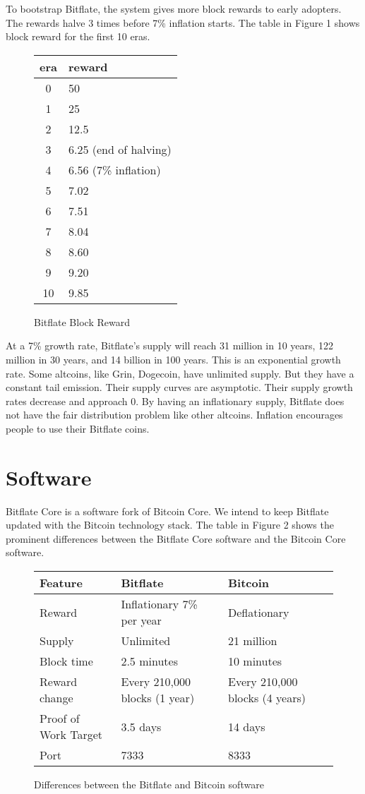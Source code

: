 \documentclass{article}      %
\begin{document}
To bootstrap Bitflate, the system gives more block rewards to early adopters. The rewards halve 3 times before 7\% inflation starts. The table in Figure 1 shows block reward for the first 10 eras.

\begin{figure}[h]
\centering
\begin{tabular}{ |c|l| } 
 \hline
 era & reward \\
 \hline
 0  & 50 \\
 1 & 25 \\
 2 & 12.5 \\
 3 & 6.25 (end of halving) \\
 4 & 6.56 (7\% inflation) \\
 5 & 7.02 \\
 6 & 7.51 \\
 7 & 8.04 \\
 8 & 8.60 \\
 9 & 9.20 \\
 10 & 9.85 \\
 \hline
\end{tabular}
\caption{Bitflate Block Reward}
\end{figure}

At a 7\% growth rate, Bitflate's supply will reach 31 million in 10 years, 122 million in 30 years, and 14 billion in 100 years. This is an exponential growth rate. Some altcoins, like Grin, Dogecoin, have unlimited supply. But they have a constant tail emission. Their supply curves are asymptotic. Their supply growth rates decrease and approach 0. By having an inflationary supply, Bitflate does not have the fair distribution problem like other altcoins. Inflation encourages people to use their Bitflate coins.

\section{Software}

Bitflate Core is a software fork of Bitcoin Core. We intend to keep Bitflate updated with the Bitcoin technology stack. The table in Figure 2 shows the prominent differences between the Bitflate Core software and the Bitcoin Core software.

\begin{figure}[h]
\centering
\begin{tabular}{ |l|l|l| } 
 \hline
 Feature & Bitflate & Bitcoin \\
 \hline
 Reward & Inflationary 7\% per year & Deflationary \\
 \hline
 Supply & Unlimited & 21 million \\
 \hline
 Block time & 2.5 minutes & 10 minutes \\
 \hline
 Reward change & Every 210,000 blocks (1 year) & Every 210,000 blocks (4 years) \\
 \hline
 Proof of Work Target & 3.5 days & 14 days \\
 \hline
 Port & 7333 & 8333 \\
 \hline
\end{tabular}
\caption{Differences between the Bitflate and Bitcoin software}
\end{figure}
\end{document}
